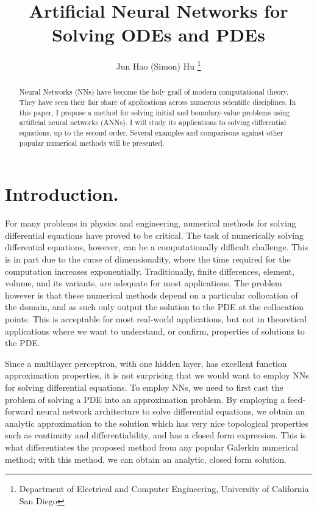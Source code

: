 \documentclass[10pt]{article}
\title{Artificial Neural Networks for Solving ODEs and PDEs}
\author{Jun Hao (Simon) Hu \footnote{Department of Electrical and Computer Engineering, University of California San Diego}}
\theoremstyle{plain}
\theoremstyle{definition}
\theoremstyle{remark}
\numberwithin{theorem}{section}
\numberwithin{proposition}{section}
\numberwithin{remark}{section}
\numberwithin{corollary}{section}
\numberwithin{definition}{section}
\numberwithin{lemma}{section}
\numberwithin{equation}{section}
\begin{document}
\maketitle 

\begin{abstract}
	Neural Networks (NNs) have become the holy grail of modern computational theory. They have seen their fair share of applications across numerous scientific disciplines. In this paper, I propose a method for solving initial and boundary-value problems using artificial neural networks (ANNs). I will study its applications to solving differential equations, up to the second order. Several examples and comparisons against other popular numerical methods will be presented. 
\end{abstract}


\section{Introduction.}
For many problems in physics and engineering, numerical methods for solving differential equations have proved to be critical. The task of numerically solving differential equations, however, can be a computationally difficult challenge. This is in part due to the curse of dimensionality, where the time required for the computation increases exponentially. Traditionally, finite differences, element, volume, and its variants, are adequate for most applications. The problem however is that these numerical methods depend on a particular collocation of the domain, and as such only output the solution to the PDE at the collocation points. This is acceptable for most real-world applications, but not in theoretical applications where we want to understand, or confirm, properties of solutions to the PDE. 

Since a multilayer perceptron, with one hidden layer, has excellent function approximation properties, it is not surprising that we would want to employ NNs for solving differential equations. To employ NNs, we need to first cast the problem of solving a PDE into an approximation problem. By employing a feed-forward neural network architecture to solve differential equations, we obtain an analytic approximation to the solution which has very nice topological properties such as continuity and differentiability, and has a closed form expression. This is what differentiates the proposed method from any popular Galerkin numerical method; with this method, we can obtain an analytic, closed form solution. 
\end{document}
